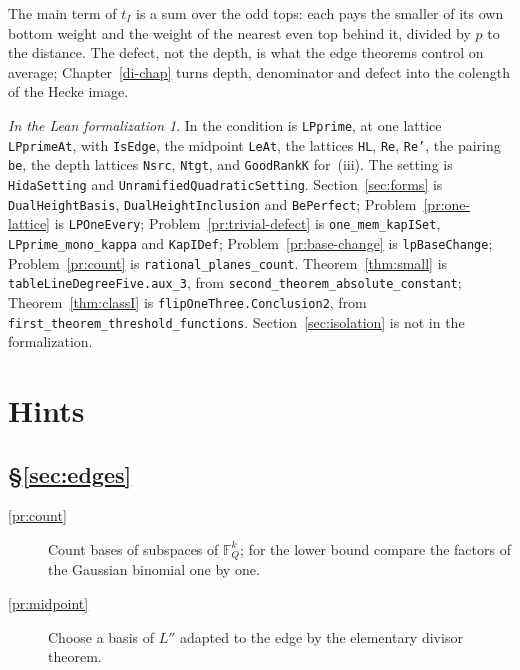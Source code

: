 \documentclass[reqno]{amsart}
\newcounter{chap}
\theoremstyle{definition}
\theoremstyle{plain}
\theoremstyle{remark}
\newtheorem*{leanremark}{In the Lean formalization}
\newcommand{\F}{\mathbb F}
\newcommand{\tl}[1]{\texttt{#1}}
\begin{document}
The main term of \(t_I\) is a sum over the odd tops: each pays the smaller of its own bottom weight and the weight of the nearest even top behind it, divided by \(p\) to the distance.  The defect, not the depth, is what the edge theorems control on average; Chapter~\ref{di-chap} turns depth, denominator and defect into the colength of the Hecke image.

\begin{leanremark}
\raggedright In \cite{Lean} the condition is \tl{LPprime}, at one lattice \tl{LPprimeAt}, with \tl{IsEdge}, the midpoint \tl{LeAt}, the lattices \tl{HL}, \tl{Re}, \tl{Re'}, the pairing \tl{be}, the depth lattices \tl{Nsrc}, \tl{Ntgt}, and \tl{GoodRankK} for~(iii).  The setting is \tl{HidaSetting} and \tl{UnramifiedQuadraticSetting}.  Section~\ref{sec:forms} is \tl{DualHeightBasis}, \tl{DualHeightInclusion} and \tl{BePerfect}; Problem~\ref{pr:one-lattice} is \tl{LPOneEvery}; Problem~\ref{pr:trivial-defect} is \tl{one\_\allowbreak{}mem\_\allowbreak{}kapISet}, \tl{LPprime\_\allowbreak{}mono\_\allowbreak{}kappa} and \tl{KapIDef}; Problem~\ref{pr:base-change} is \tl{lpBaseChange}; Problem~\ref{pr:count} is \tl{rational\_\allowbreak{}planes\_\allowbreak{}count}.  Theorem~\ref{thm:small} is \tl{tableLineDegreeFive.aux\_3}, from \tl{second\_\allowbreak{}theorem\_\allowbreak{}absolute\_\allowbreak{}constant}; Theorem~\ref{thm:classI} is \tl{flipOneThree.Conclusion2}, from \tl{first\_\allowbreak{}theorem\_\allowbreak{}threshold\_\allowbreak{}functions}.  Section~\ref{sec:isolation} is not in the formalization.
\end{leanremark}

\section*{Hints}

\subsection*{\S\ref{sec:edges}}
\begin{description}
\item[\ref{pr:count}] Count bases of subspaces of \(\F_Q^k\); for the lower bound compare the factors of the Gaussian binomial one by one.
\item[\ref{pr:midpoint}] Choose a basis of \(L''\) adapted to the edge by the elementary divisor theorem.
\end{description}
\end{document}
